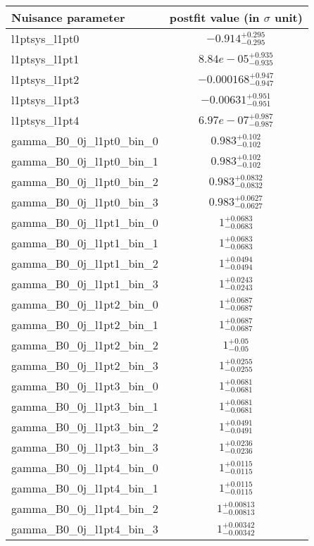 
\begin{tabular}{|l|c|}
\hline
Nuisance parameter & postfit value (in $\sigma$ unit) \\\hline
l1ptsys\_l1pt0 & $-0.914^{+0.295}_{-0.295}$ \\
l1ptsys\_l1pt1 & $8.84e-05^{+0.935}_{-0.935}$ \\
l1ptsys\_l1pt2 & $-0.000168^{+0.947}_{-0.947}$ \\
l1ptsys\_l1pt3 & $-0.00631^{+0.951}_{-0.951}$ \\
l1ptsys\_l1pt4 & $6.97e-07^{+0.987}_{-0.987}$ \\
gamma\_B0\_0j\_l1pt0\_bin\_0 & $0.983^{+0.102}_{-0.102}$ \\
gamma\_B0\_0j\_l1pt0\_bin\_1 & $0.983^{+0.102}_{-0.102}$ \\
gamma\_B0\_0j\_l1pt0\_bin\_2 & $0.983^{+0.0832}_{-0.0832}$ \\
gamma\_B0\_0j\_l1pt0\_bin\_3 & $0.983^{+0.0627}_{-0.0627}$ \\
gamma\_B0\_0j\_l1pt1\_bin\_0 & $1^{+0.0683}_{-0.0683}$ \\
gamma\_B0\_0j\_l1pt1\_bin\_1 & $1^{+0.0683}_{-0.0683}$ \\
gamma\_B0\_0j\_l1pt1\_bin\_2 & $1^{+0.0494}_{-0.0494}$ \\
gamma\_B0\_0j\_l1pt1\_bin\_3 & $1^{+0.0243}_{-0.0243}$ \\
gamma\_B0\_0j\_l1pt2\_bin\_0 & $1^{+0.0687}_{-0.0687}$ \\
gamma\_B0\_0j\_l1pt2\_bin\_1 & $1^{+0.0687}_{-0.0687}$ \\
gamma\_B0\_0j\_l1pt2\_bin\_2 & $1^{+0.05}_{-0.05}$ \\
gamma\_B0\_0j\_l1pt2\_bin\_3 & $1^{+0.0255}_{-0.0255}$ \\
gamma\_B0\_0j\_l1pt3\_bin\_0 & $1^{+0.0681}_{-0.0681}$ \\
gamma\_B0\_0j\_l1pt3\_bin\_1 & $1^{+0.0681}_{-0.0681}$ \\
gamma\_B0\_0j\_l1pt3\_bin\_2 & $1^{+0.0491}_{-0.0491}$ \\
gamma\_B0\_0j\_l1pt3\_bin\_3 & $1^{+0.0236}_{-0.0236}$ \\
gamma\_B0\_0j\_l1pt4\_bin\_0 & $1^{+0.0115}_{-0.0115}$ \\
gamma\_B0\_0j\_l1pt4\_bin\_1 & $1^{+0.0115}_{-0.0115}$ \\
gamma\_B0\_0j\_l1pt4\_bin\_2 & $1^{+0.00813}_{-0.00813}$ \\
gamma\_B0\_0j\_l1pt4\_bin\_3 & $1^{+0.00342}_{-0.00342}$ \\
\hline
\end{tabular}
